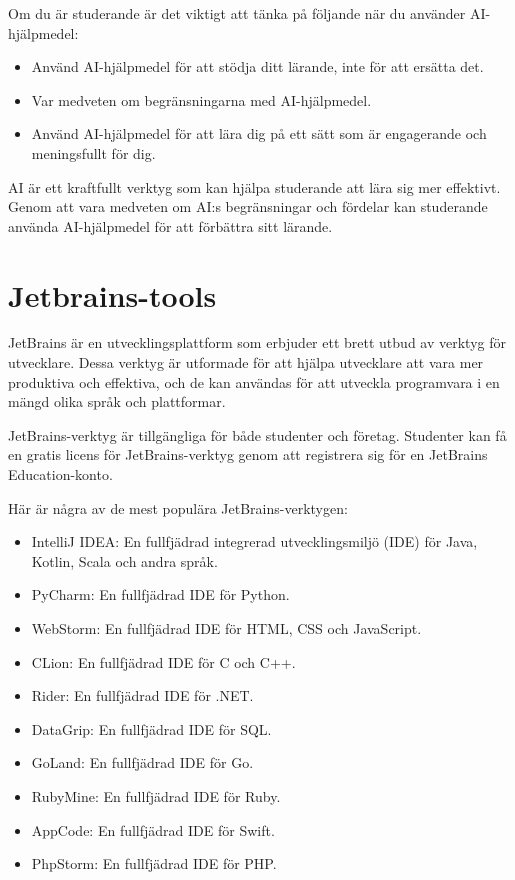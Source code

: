 Om du är studerande är det viktigt att tänka på följande när du använder
AI-hjälpmedel:

\begin{itemize}
\tightlist
\item
  Använd AI-hjälpmedel för att stödja ditt lärande, inte för att ersätta
  det.
\item
  Var medveten om begränsningarna med AI-hjälpmedel.
\item
  Använd AI-hjälpmedel för att lära dig på ett sätt som är engagerande
  och meningsfullt för dig.
\end{itemize}

AI är ett kraftfullt verktyg som kan hjälpa studerande att lära sig mer
effektivt. Genom att vara medveten om AI:s begränsningar och fördelar
kan studerande använda AI-hjälpmedel för att förbättra sitt lärande.

\hypertarget{jetbrains-tools}{%
\section{Jetbrains-tools}\label{jetbrains-tools}}

JetBrains är en utvecklingsplattform som erbjuder ett brett utbud av
verktyg för utvecklare. Dessa verktyg är utformade för att hjälpa
utvecklare att vara mer produktiva och effektiva, och de kan användas
för att utveckla programvara i en mängd olika språk och plattformar.

JetBrains-verktyg är tillgängliga för både studenter och företag.
Studenter kan få en gratis licens för JetBrains-verktyg genom att
registrera sig för en JetBrains Education-konto.

Här är några av de mest populära JetBrains-verktygen:

\begin{itemize}
\tightlist
\item
  IntelliJ IDEA: En fullfjädrad integrerad utvecklingsmiljö (IDE) för
  Java, Kotlin, Scala och andra språk.
\item
  PyCharm: En fullfjädrad IDE för Python.
\item
  WebStorm: En fullfjädrad IDE för HTML, CSS och JavaScript.
\item
  CLion: En fullfjädrad IDE för C och C++.
\item
  Rider: En fullfjädrad IDE för .NET.
\item
  DataGrip: En fullfjädrad IDE för SQL.
\item
  GoLand: En fullfjädrad IDE för Go.
\item
  RubyMine: En fullfjädrad IDE för Ruby.
\item
  AppCode: En fullfjädrad IDE för Swift.
\item
  PhpStorm: En fullfjädrad IDE för PHP.
\end{itemize}

